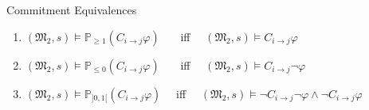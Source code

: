 \vspace{0.9cm}
\begin{theorem}\label{Commitment-Equivelances}{Commitment Equivalences} ~

\begin{enumerate}
\item $(\mathfrak{M_2},s)\models \mathbb{P}_{\geq1} (C_{i \rightarrow
j}\varphi)$ ~~~iff~~ $(\mathfrak{M_2},s)\models C_{i \rightarrow
j}\varphi$

\item $(\mathfrak{M_2},s)\models \mathbb{P}_{\leq0} (C_{i \rightarrow
j}\varphi)$ ~~~iff~~ $(\mathfrak{M_2},s)\models C_{i \rightarrow
j}\neg \varphi$

\item $(\mathfrak{M_2},s)\models \mathbb{P}_{]0,1[} (C_{i \rightarrow
j}\varphi)$ ~~iff~~ $(\mathfrak{M_2},s)\models \neg C_{i
\rightarrow j}\neg\varphi \wedge \neg C_{i \rightarrow j}\varphi$

\end{enumerate}

\end{theorem}
